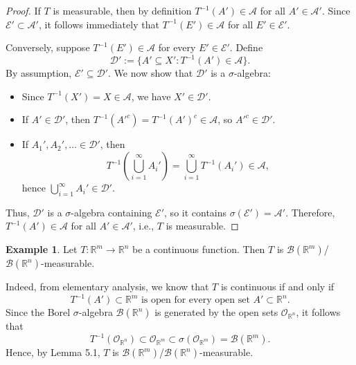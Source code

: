 \documentclass[12pt]{article}
\theoremstyle{definition}
\newtheorem{example}{Example}[section]
\begin{document}
\begin{proof}
If \( T \) is measurable, then by definition \( T^{-1}(A') \in \mathcal{A} \) for all \( A' \in \mathcal{A}' \). Since \( \mathcal{E}' \subset \mathcal{A}' \), it follows immediately that \( T^{-1}(E') \in \mathcal{A} \) for all \( E' \in \mathcal{E}' \).

Conversely, suppose \( T^{-1}(E') \in \mathcal{A} \) for every \( E' \in \mathcal{E}' \). Define
\[
\mathcal{D}' := \{ A' \subseteq X' : T^{-1}(A') \in \mathcal{A} \}.
\]
By assumption, \( \mathcal{E}' \subseteq \mathcal{D}' \). We now show that \( \mathcal{D}' \) is a \( \sigma \)-algebra:

\begin{itemize}
  \item Since \( T^{-1}(X') = X \in \mathcal{A} \), we have \( X' \in \mathcal{D}' \).
  \item If \( A' \in \mathcal{D}' \), then \( T^{-1}(A'^c) = T^{-1}(A')^c \in \mathcal{A} \), so \( A'^c \in \mathcal{D}' \).
  \item If \( A_1', A_2', \dots \in \mathcal{D}' \), then
  \[
  T^{-1}\left( \bigcup_{i=1}^\infty A_i' \right) = \bigcup_{i=1}^\infty T^{-1}(A_i') \in \mathcal{A},
  \]
  hence \( \bigcup_{i=1}^\infty A_i' \in \mathcal{D}' \).
\end{itemize}

Thus, \( \mathcal{D}' \) is a \( \sigma \)-algebra containing \( \mathcal{E}' \), so it contains \( \sigma(\mathcal{E}') = \mathcal{A}' \). Therefore, \( T^{-1}(A') \in \mathcal{A} \) for all \( A' \in \mathcal{A}' \), i.e., \( T \) is measurable.
\end{proof}

\medskip
\begin{example}
Let \( T : \mathbb{R}^m \to \mathbb{R}^n \) be a continuous function. Then \( T \) is \( \mathcal{B}(\mathbb{R}^m) \)/\( \mathcal{B}(\mathbb{R}^n) \)-measurable.

Indeed, from elementary analysis, we know that \( T \) is continuous if and only if
\[
T^{-1}(A') \subset \mathbb{R}^m \text{ is open for every open set } A' \subset \mathbb{R}^n.
\]
Since the Borel \( \sigma \)-algebra \( \mathcal{B}(\mathbb{R}^n) \) is generated by the open sets \( \mathcal{O}_{\mathbb{R}^n} \), it follows that
\[
T^{-1}(\mathcal{O}_{\mathbb{R}^n}) \subset \mathcal{O}_{\mathbb{R}^m} \subset \sigma(\mathcal{O}_{\mathbb{R}^m}) = \mathcal{B}(\mathbb{R}^m).
\]
Hence, by Lemma 5.1, \( T \) is \( \mathcal{B}(\mathbb{R}^m) \)/\( \mathcal{B}(\mathbb{R}^n) \)-measurable.
\end{example}
\end{document}
